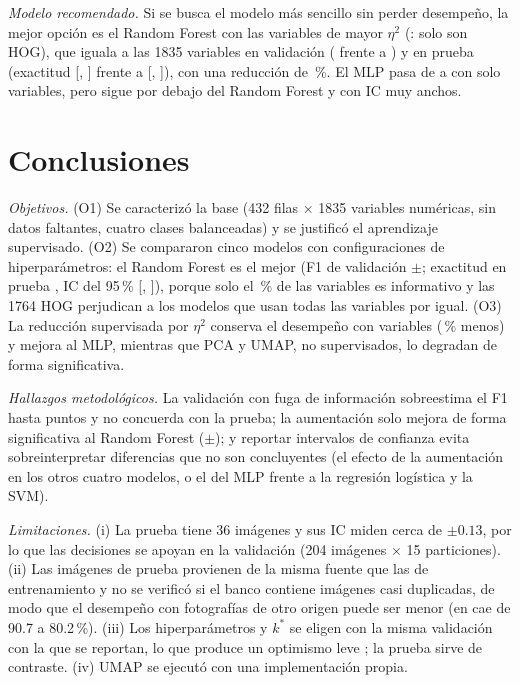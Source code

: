 \documentclass[journal]{IEEEtran}
\begin{document}
\emph{Modelo recomendado.} Si se busca el modelo más sencillo sin perder desempeño, la mejor opción es el Random Forest con las  variables de mayor $\eta^2$ (: solo  son HOG), que iguala a las 1835 variables en validación ( frente a ) y en prueba (exactitud  [, ] frente a  [, ]), con una reducción de \,\%. El MLP pasa de  a  con solo  variables, pero sigue por debajo del Random Forest y con IC muy anchos.

\section{Conclusiones}
\emph{Objetivos.} (O1) Se caracterizó la base (432 filas $\times$ 1835 variables numéricas, sin datos faltantes, cuatro clases balanceadas) y se justificó el aprendizaje supervisado. (O2) Se compararon cinco modelos con  configuraciones de hiperparámetros: el Random Forest es el mejor (F1 de validación $\pm$; exactitud en prueba , IC del 95\,\% [, ]), porque solo el \,\% de las variables es informativo y las 1764 HOG perjudican a los modelos que usan todas las variables por igual. (O3) La reducción supervisada por $\eta^2$ conserva el desempeño con  variables (\,\% menos) y mejora al MLP, mientras que PCA y UMAP, no supervisados, lo degradan de forma significativa.

\emph{Hallazgos metodológicos.} La validación con fuga de información sobreestima el F1 hasta  puntos y no concuerda con la prueba; la aumentación solo mejora de forma significativa al Random Forest ($\pm$); y reportar intervalos de confianza evita sobreinterpretar diferencias que no son concluyentes (el efecto de la aumentación en los otros cuatro modelos, o el del MLP frente a la regresión logística y la SVM).

\emph{Limitaciones.} (i) La prueba tiene 36 imágenes y sus IC miden cerca de $\pm0.13$, por lo que las decisiones se apoyan en la validación (204 imágenes $\times$ 15 particiones). (ii) Las imágenes de prueba provienen de la misma fuente que las de entrenamiento y no se verificó si el banco contiene imágenes casi duplicadas, de modo que el desempeño con fotografías de otro origen puede ser menor (en \cite{long2025} cae de 90.7 a 80.2\,\%). (iii) Los hiperparámetros y $k^*$ se eligen con la misma validación con la que se reportan, lo que produce un optimismo leve \cite{cawley2010}; la prueba sirve de contraste. (iv) UMAP se ejecutó con una implementación propia.
\end{document}
